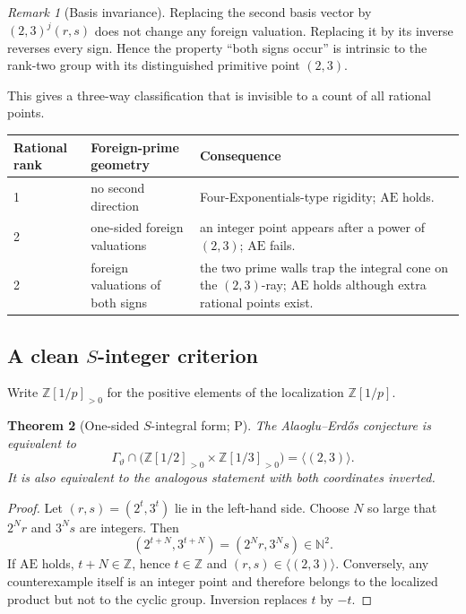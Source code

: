 \documentclass[10pt,oneside]{article}
\newtheorem{theorem}{Theorem}[section]
\theoremstyle{definition}
\theoremstyle{remark}
\newtheorem{remark}[theorem]{Remark}
\newcommand{\N}{\mathbb N}
\newcommand{\Z}{\mathbb Z}
\newcommand{\thetaq}{\vartheta}
\newcommand{\AEconj}{\mathrm{AE}}
\newcommand{\statusP}{\textsc{P}}
\begin{document}
\begin{remark}[Basis invariance]
Replacing the second basis vector by \((2,3)^j(r,s)\) does not change any foreign valuation.  Replacing it by its inverse reverses every sign.  Hence the property ``both signs occur'' is intrinsic to the rank-two group with its distinguished primitive point \((2,3)\).
\end{remark}

This gives a three-way classification that is invisible to a count of all rational points.
\begin{center}
\begin{tabularx}{0.95\textwidth}{p{}p{}X}
\toprule
Rational rank & Foreign-prime geometry & Consequence \\
\midrule
1 & no second direction & Four-Exponentials-type rigidity; \(\AEconj\) holds. \\
2 & one-sided foreign valuations & an integer point appears after a power of \((2,3)\); \(\AEconj\) fails. \\
2 & foreign valuations of both signs & the two prime walls trap the integral cone on the \((2,3)\)-ray; \(\AEconj\) holds although extra rational points exist. \\
\bottomrule
\end{tabularx}
\end{center}

\subsection{A clean \texorpdfstring{\(S\)}{S}-integer criterion}
Write \(\Z[1/p]_{>0}\) for the positive elements of the localization \(\Z[1/p]\).

\begin{theorem}[One-sided \(S\)-integral form; \statusP]
\label{thm:S-integral-form}
The Alaoglu--Erd\H{o}s conjecture is equivalent to
\begin{equation}
 \Gamma_{\thetaq}\cap
 \bigl(\Z[1/2]_{>0}\times\Z[1/3]_{>0}\bigr)
 =\langle(2,3)\rangle.
\label{eq:S-integral-form}
\end{equation}
It is also equivalent to the analogous statement with both coordinates inverted.
\end{theorem}

\begin{proof}
Let \((r,s)=(2^t,3^t)\) lie in the left-hand side.  Choose \(N\) so large that \(2^Nr\) and \(3^Ns\) are integers.  Then
\[
 (2^{t+N},3^{t+N})=(2^Nr,3^Ns)\in\N^2.
\]
If \(\AEconj\) holds, \(t+N\in\Z\), hence \(t\in\Z\) and \((r,s)\in\langle(2,3)\rangle\).  Conversely, any counterexample itself is an integer point and therefore belongs to the localized product but not to the cyclic group.  Inversion replaces \(t\) by \(-t\).
\end{proof}
\end{document}
